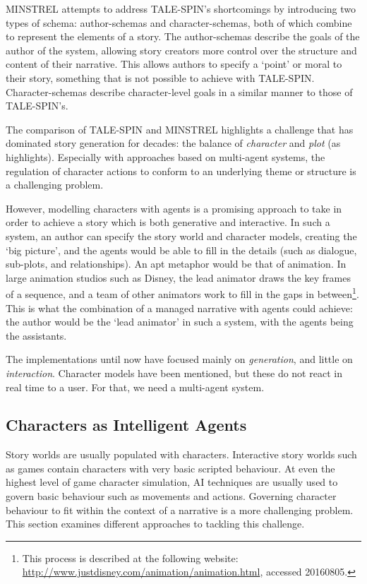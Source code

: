 \documentclass[11pt]{report}
\begin{document}
MINSTREL attempts to address TALE-SPIN's shortcomings by introducing two types of schema: author-schemas and character-schemas, both of which combine to represent the elements of a story. The author-schemas describe the goals of the author of the system, allowing story creators more control over the structure and content of their narrative. This allows authors to specify a `point' or moral to their story, something that is not possible to achieve with TALE-SPIN. Character-schemas describe character-level goals in a similar manner to those of TALE-SPIN's.

The comparison of TALE-SPIN and MINSTREL highlights a challenge that has
dominated story generation for decades: the balance of \emph{character} and
\emph{plot} (as~\citet{riedl2010narrative} highlights). Especially with approaches based on multi-agent systems, the regulation of character actions to conform to an underlying theme or structure is a challenging problem.

However, modelling characters with agents is a promising approach to take in order to achieve a story which is both generative and interactive. In such a system, an author can specify the story world and character models, creating the `big picture', and the agents would be able to fill in the details (such as dialogue, sub-plots, and relationships).
An apt metaphor would be that of animation. In large animation studios such as
Disney, the lead animator draws the key frames of a sequence, and a team of
other animators work to fill in the gaps in
between\footnote{This process is described at the following website:
  \url{http://www.justdisney.com/animation/animation.html}, accessed 20160805.}. This is what the combination of a managed narrative with agents could achieve: the author would be the `lead animator' in such a system, with the agents being the assistants.

The implementations until now have focused mainly on \emph{generation\/}, and little on \emph{interaction\/}. Character models have been mentioned, but these do not react in real time to a user. For that, we need a multi-agent system.

\subsection{Characters as Intelligent Agents}
Story worlds are usually populated with characters. Interactive story worlds
such as games contain characters with very basic scripted behaviour. At even the
highest level of game character simulation, AI techniques are usually used to
govern basic behaviour such as movements and actions. Governing character
behaviour to fit within the context of a narrative is a more challenging
problem. This section examines different approaches to tackling this challenge.
\end{document}

